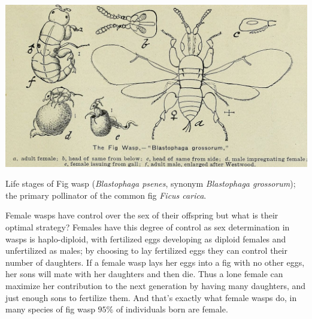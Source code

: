 {\begin{marginfigure}
  \begin{center}
    \includegraphics[width= \textwidth]{illustration_images/single_locus_selection/Fig_wasp/1280px-A_descriptive_catalogue_of_fruit_and_forest_trees_vines_and_shrubs_choice_palms_and_roses.jpg}
\end{center}  %
\caption{
Life stages of Fig wasp ({\it Blastophaga psenes}, synonym {\it Blastophaga
    grossorum}); the primary pollinator of the common fig {\it Ficus carica}.
} \label{fig:fig_wasp}
\end{marginfigure}

Female wasps have control over the sex of their offspring but what is their optimal strategy? Females have
this degree of control as sex determination in wasps is haplo-diploid, with fertilized eggs
developing as diploid females and unfertilized as males; by choosing
to lay fertilized eggs they can control their number of daughters. 
If a female wasp lays her eggs into a fig with no other eggs, her sons
will mate with her daughters and then die. Thus a lone female can maximize
her contribution to the next generation by having many daughters, and
just enough sons to fertilize them. And that's exactly what female
wasps do, in many species of fig wasp $95\%$ of individuals born are
female. 


}
